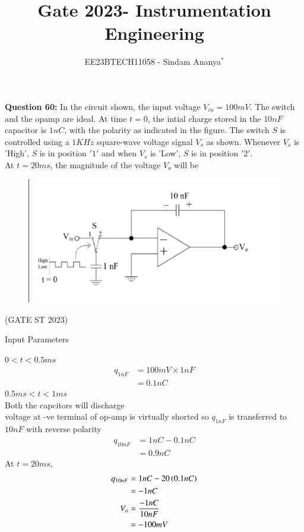 \documentclass[journal,12pt,twocolumn]{IEEEtran}
\theoremstyle{remark}
\begin{document}

\vspace{3cm}

\title{Gate 2023- Instrumentation Engineering}
\author{EE23BTECH11058 - Sindam Ananya$^{*}$%
}
\maketitle
\newpage
\bigskip

\renewcommand{\thefigure}{\theenumi}
\renewcommand{\thetable}{\theenumi}

\vspace{3cm}
\textbf{Question 60:} 
In the circuit shown, the input voltage $V_{in} = 100mV$. The switch and the opamp are ideal. At time $t=0$, the intial charge stored in the $10nF$ capacitor is $1nC$, with the polarity as indicated in the figure. The switch $S$ is controlled using a $1KHz$ square-wave voltage signal $V_s$ as shown. Whenever $V_s$ is 'High', $S$ is in position $'1'$ and when $V_s$ is 'Low', $S$ is in position $'2'$.\\
At $t = 20ms$, the magnitude of the voltage $V_o$ will be  \\  
\begin{figure}[h!]
    \centering
    \includegraphics[width=\columnwidth]{ingate60.png}
    \label{fig:ingate60}
\end{figure}
\hfill{(GATE ST 2023)}\\
\solution
\begin{table}[h!]
    \centering
    
    \caption{Input Parameters}
    \label{tab:gatein60table}
\end{table}
$ 0 < t < 0.5ms $
\begin{align}
q_{1nF} &= 100mV \times 1nF\\ 
        &= 0.1nC
\end{align}
$ 0.5ms < t < 1ms $\\
Both the capcitors will discharge\\
voltage at -ve terminal of op-amp is virtually shorted so $q_{1nF}$ is transferred to $10nF$ with reverse polarity\\
\begin{align}
q_{10nF} &= 1nC - 0.1nC\\
         &= 0.9nC
\end{align}
At $t = 20ms$,
\begin{align}
q_{10nF} &= 1nC - 20 \left(0.1nC\right)\\
         &= -1nC\\
V_o &= \frac{-1nC}{10nF}\\
    &= -100mV
\end{align}
\end{document}
